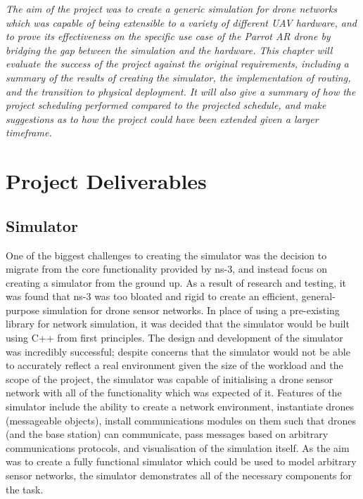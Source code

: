 \label{projeval}

\emph{The aim of the project was to create a generic simulation for drone networks which was capable of being extensible to a variety of different UAV hardware, and to prove its effectiveness on the specific use case of the Parrot AR drone by bridging the gap between the simulation and the hardware. This chapter will evaluate the success of the project against the original requirements, including a summary of the results of creating the simulator, the implementation of routing, and the transition to physical deployment. It will also give a summary of how the project scheduling performed compared to the projected schedule, and make suggestions as to how the project could have been extended given a larger timeframe.}

\section{Project Deliverables}

\subsection{Simulator}
One of the biggest challenges to creating the simulator was the decision to migrate from the core functionality provided by ns-3, and instead focus on creating a simulator from the ground up. As a result of research and testing, it was found that ns-3 was too bloated and rigid to create an efficient, general-purpose simulation for drone sensor networks. In place of using a pre-existing library for network simulation, it was decided that the simulator would be built using C++ from first principles. The design and development of the simulator was incredibly successful; despite concerns that the simulator would not be able to accurately reflect a real environment given the size of the workload and the scope of the project, the simulator was capable of initialising a drone sensor network with all of the functionality which was expected of it. Features of the simulator include the ability to create a network environment, instantiate drones (messageable objects), install communications modules on them such that drones (and the base station) can communicate, pass messages based on arbitrary communications protocols, and visualisation of the simulation itself. As the aim was to create a fully functional simulator which could be used to model arbitrary sensor networks, the simulator demonstrates all of the necessary components for the task.
